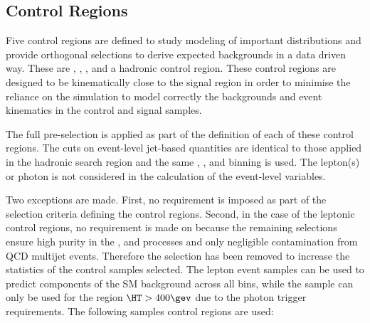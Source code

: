 \subsection{Control Regions}

Five control regions are defined to study modeling of important distributions and provide orthogonal selections to derive expected backgrounds in a data driven way.
These are \mj, \mmj, \gj, \eej and a hadronic control region. These control regions are designed to be kinematically close to the signal region in order to minimise the reliance on the simulation to model correctly the backgrounds and event kinematics in the control and signal samples.



The full pre-selection is applied as part of the definition of each of these control regions. The cuts on event-level jet-based quantities are identical to
those applied in the hadronic search region and the same \njet, \nb, and \scalht binning is used. The lepton(s) or photon is not considered in the calculation of the event-level variables. 

Two exceptions are made. First, no \bdphi requirement is imposed as part of the selection criteria defining the control regions. Second,
in the case of the leptonic control regions, no requirement is made on \alphat because the remaining selections ensure high purity in the \wj, \ttbar and \zll processes and only negligible  contamination from QCD multijet events. Therefore the \alphat selection has been removed to increase the statistics of the control samples selected. The lepton event samples can be used to predict components of the SM background across all \scalht bins, while the \gj sample can only be used for the region $\HT > 400\gev$ due to the photon trigger requirements. The following samples control regions are used:


